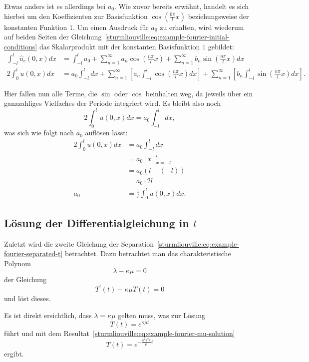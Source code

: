 Etwas anders ist es allerdings bei $a_0$.
Wie zuvor bereits erwähnt, handelt es sich hierbei um den Koeffizienten
zur Basisfunktion $\cos\left(\frac{0 \pi}{l}x\right)$ beziehungsweise der
konstanten Funktion $1$.
Um einen Ausdruck für $a_0$ zu erhalten, wird wiederum auf beiden Seiten
der Gleichung~\eqref{sturmliouville:eq:example-fourier-initial-conditions} das
Skalarprodukt mit der konstanten Basisfunktion $1$ gebildet:
\[
\begin{aligned}
    \int_{-l}^{l}\hat{u}_c(0, x)dx
    &=
    \int_{-l}^{l} a_0
    +
    \sum_{n = 1}^{\infty} a_n\cos\left(\frac{n\pi}{l}x\right)
    +
    \sum_{n = 1}^{\infty} b_n\sin\left(\frac{n\pi}{l}x\right)dx
    \\
    2\int_{0}^{l}u(0, x)dx
    &=
    a_0 \int_{-l}^{l}dx
    +
    \sum_{n = 1}^{\infty}\left[a_n\int_{-l}^{l}\cos\left(\frac{n\pi}{l}x\right)
        dx\right] +
    \sum_{n = 1}^{\infty}\left[b_n\int_{-l}^{l}\sin\left(\frac{n\pi}{l}x\right)
        dx\right].
\end{aligned}
\]

Hier fallen nun alle Terme, die $\sin$ oder $\cos$ beinhalten weg, da jeweils
über ein ganzzahliges Vielfaches der Periode integriert wird.
Es bleibt also noch
\[
    2\int_{0}^{l}u(0, x)dx
    =
    a_0 \int_{-l}^{l}dx,
\]
was sich wie folgt nach $a_0$ auflösen lässt:
\[
\begin{aligned}
    2\int_{0}^{l}u(0, x)dx
    &=
    a_0 \int_{-l}^{l}dx
    \\
    &=
    a_0 \left[x\right]_{x=-l}^{l}
    \\
    &=
    a_0(l - (-l))
    \\
    &=
    a_0 \cdot 2l
    \\
    a_0
    &=
    \frac{1}{l} \int_{0}^{l}u(0, x)dx.
\end{aligned}
\]

%
%

\subsection{Lösung der Differentialgleichung in \texorpdfstring{$t$}{t}}
Zuletzt wird die zweite Gleichung der 
Separation~\eqref{sturmliouville:eq:example-fourier-separated-t} betrachtet.
Dazu betrachtet man das charakteristische Polynom
\[
    \lambda - \kappa \mu
    =
    0
\]
der Gleichung
\[
    T^{\prime}(t) - \kappa \mu T(t)
    =
    0
\]
und löst dieses.

Es ist direkt ersichtlich, dass $\lambda = \kappa \mu$ gelten muss, was zur
Lösung
\[
    T(t)
    =
    e^{\kappa \mu t}
\]
führt und mit dem Resultat~\eqref{sturmliouville:eq:example-fourier-mu-solution}
\[
    T(t)
    =
    e^{-\frac{n^{2}\pi^{2}\kappa}{l^{2}}t}
\]
ergibt.

